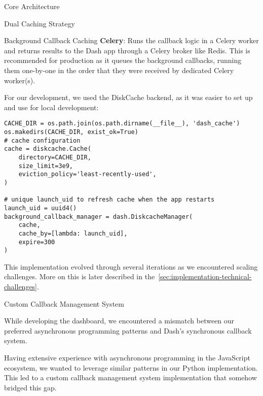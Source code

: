 \begin{section}{Core Architecture}
\begin{subsection}{Dual Caching Strategy}
\begin{subsubsection}{Background Callback Caching}
			\textbf{Celery}: Runs the callback logic in a Celery worker\cite{celery_userguide_workers} and returns results to the Dash app through a Celery broker like Redis.
			This is recommended for production as it queues the background callbacks, running them one-by-one in the order that they were received by dedicated Celery worker(s).

			For our development, we used the DiskCache backend, as it was easier to set up and use for local development:

			\begin{listing}[H]
				\caption{DiskCache Background Callback Manager Setup}
				\begin{verbatim}
CACHE_DIR = os.path.join(os.path.dirname(__file__), 'dash_cache')
os.makedirs(CACHE_DIR, exist_ok=True)
# cache configuration
cache = diskcache.Cache(
	directory=CACHE_DIR,
	size_limit=3e9,
	eviction_policy='least-recently-used',
)

# unique launch_uid to refresh cache when the app restarts
launch_uid = uuid4()
background_callback_manager = dash.DiskcacheManager(
	cache,
	cache_by=[lambda: launch_uid],
	expire=300
)
				\end{verbatim}
				\label{lst:dashboard-implementation-callback-cache}
			\end{listing}

			This implementation evolved through several iterations as we encountered scaling challenges.
			More on this is later described in the~\autoref{sec:implementation-technical-challenges}.
		\end{subsubsection}
	\end{subsection}

	\begin{subsection}{Custom Callback Management System}
		\label{subsec:implementation-core-architecture-callbacks}

		While developing the dashboard, we encountered a mismatch between our preferred asynchronous programming patterns and Dash's synchronous callback system.

		Having extensive experience with asynchronous programming in the JavaScript ecosystem, we wanted to leverage similar patterns in our Python implementation.
		This led to a custom callback management system implementation that somehow bridged this gap.


\end{subsection}
\end{section}
